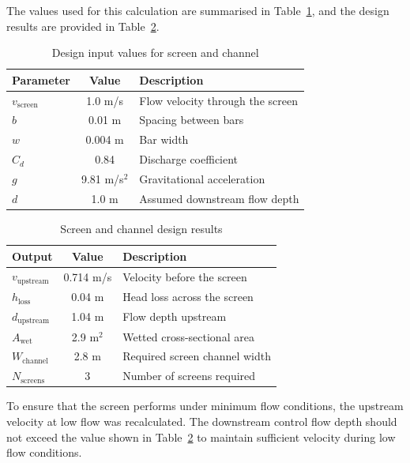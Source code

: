 \documentclass[12pt]{article}
\begin{document}
The values used for this calculation are summarised in Table~\ref{tab:screen_inputs}, 
and the design results are provided in Table~\ref{tab:screen_outputs}.

\begin{table}[h]
\centering
\caption{Design input values for screen and channel}
\label{tab:screen_inputs}
\begin{tabular}{|l|c|l|}
\hline
\textbf{Parameter} & \textbf{Value} & \textbf{Description} \\
\hline
$v_{\text{screen}}$ & 1.0 m/s & Flow velocity through the screen \\
$b$ & 0.01 m & Spacing between bars \\
$w$ & 0.004 m & Bar width \\
$C_d$ & 0.84 & Discharge coefficient \\
$g$ & 9.81 m/s$^2$ & Gravitational acceleration \\
$d$ & 1.0 m & Assumed downstream flow depth \\
\hline
\end{tabular}
\end{table}

\begin{table}[h]
\centering
\caption{Screen and channel design results}
\label{tab:screen_outputs}
\begin{tabular}{|l|c|l|}
\hline
\textbf{Output} & \textbf{Value} & \textbf{Description} \\
\hline
$v_{\text{upstream}}$ & 
0.714
 m/s
& Velocity before the screen \\
$h_{\text{loss}}$ & 
0.04
 m
& Head loss across the screen \\
$d_{\text{upstream}}$ & 
1.04
m & Flow depth upstream \\
$A_{\text{wet}}$ & 
2.9
m$^2$ & Wetted cross-sectional area \\
$W_{\text{channel}}$ & 
2.8
m & Required screen channel width \\
$N_{\text{screens}}$ & 
3
& Number of screens required \\
\hline
\end{tabular}
\end{table}

To ensure that the screen performs under minimum flow conditions, 
the upstream velocity at low flow was recalculated. The downstream control 
flow depth should not exceed the value shown in Table~\ref{tab:screen_outputs} to 
maintain sufficient velocity during low flow conditions.
\end{document}
